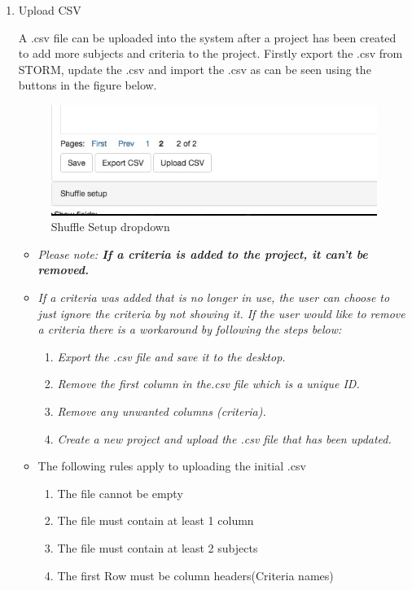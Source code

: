 \begin{enumerate}
\item Upload CSV\par
A .csv file can be uploaded into the system after a project has been created to add more subjects and criteria to the project. Firstly export the .csv from STORM, update the .csv and import the .csv as can be seen using the buttons in the figure below.\par
 \begin{figure}[H] 
	\centering
	\includegraphics[width=13cm]{./graphics/UploadCSV.jpg}\par
	\caption{Shuffle Setup dropdown}
\end{figure}
\begin{itemize}
	\item[] \textit{Please note: \textbf{If a criteria is added to the project, it can't be removed.}}
	\item[] \textit{If a criteria was added that is no longer in use, the user can choose to just ignore the criteria by not showing it. If the user would like to remove a criteria there is a workaround by following the steps below:}
	\begin{enumerate}
		\item \textit{Export the .csv file and save it to the desktop.}
		\item \textit{Remove the first column in the.csv file which is a unique ID.}
		\item \textit{Remove any unwanted columns (criteria).}
		\item \textit{Create a new project and upload the .csv file that has been updated.}
	\end{enumerate}
	\item The following rules apply to uploading the initial .csv
	\begin{enumerate}
		\item The file cannot be empty
		\item The file must contain at least 1 column
		\item The file must contain at least 2 subjects
		\item The first Row must be column headers(Criteria names)

\end{enumerate}
\end{itemize}
\end{enumerate}
